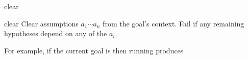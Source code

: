 \begin{tactic}{clear}
  \begin{tsyntax}[empty]{clear}
    Clear assumptions $a_1 \cdots a_n$ from the goal's context. Fail
    if any remaining hypotheses depend on any of the $a_i$.

    For example, if the current goal is
     then
    running 
    produces 
  \end{tsyntax}
\end{tactic}

